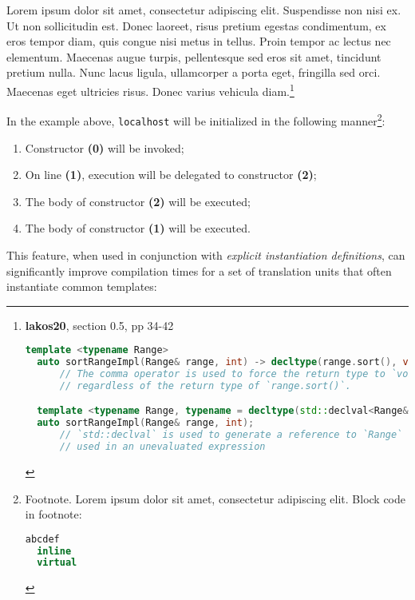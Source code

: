 \documentclass[twoside,10pt,letterpaper,usenames]{newstyle-PearsonGeneric-7-38}
\newcommand{\passthrough}[1]{\texttt{#1}}
\begin{document}
Lorem ipsum dolor sit amet, consectetur adipiscing elit. Suspendisse non
nisi ex. Ut non sollicitudin est. Donec laoreet, risus pretium egestas
condimentum, ex eros tempor diam, quis congue nisi metus in tellus.
Proin tempor ac lectus nec elementum. Maecenas augue turpis,
pellentesque sed eros sit amet, tincidunt pretium nulla. Nunc lacus
ligula, ullamcorper a porta eget, fringilla sed orci. Maecenas eget
ultricies risus. Donec varius vehicula diam.{\cprotect\footnote{\textbf{lakos20},
  section 0.5, pp 34-42

  \begin{lstlisting}[language=C++, label={testlabel},]
  template <typename Range>
  auto sortRangeImpl(Range& range, int) -> decltype(range.sort(), void());
      // The comma operator is used to force the return type to `void`,
      // regardless of the return type of `range.sort()`.

  template <typename Range, typename = decltype(std::declval<Range&>().sort()>
  auto sortRangeImpl(Range& range, int);
      // `std::declval` is used to generate a reference to `Range` that can be
      // used in an unevaluated expression
  \end{lstlisting}
      }}

In the example above, \passthrough{\lstinline!localhost!} will be
initialized in the following manner{\cprotect\footnote{Footnote. Lorem
  ipsum dolor sit amet, consectetur adipiscing elit. Block code in
  footnote:

  \begin{lstlisting}[language=C++, label={testlabel},]
  abcdef
  inline
  virtual
  \end{lstlisting}
      }}:

\begin{enumerate}
\def\labelenumi{\arabic{enumi}.}
\item
  {Constructor} \textbf{(0)} will be invoked;
\item
  On line \textbf{(1)}, execution will be delegated to constructor
  \textbf{(2)};
\item
  The body of constructor \textbf{(2)} will be executed;
\item
  The body of constructor \textbf{(1)} will be executed.
\end{enumerate}

This feature, when used in conjunction with \emph{explicit instantiation
definitions}, can significantly improve compilation times for a set of
translation units that often instantiate common templates:
\end{document}

